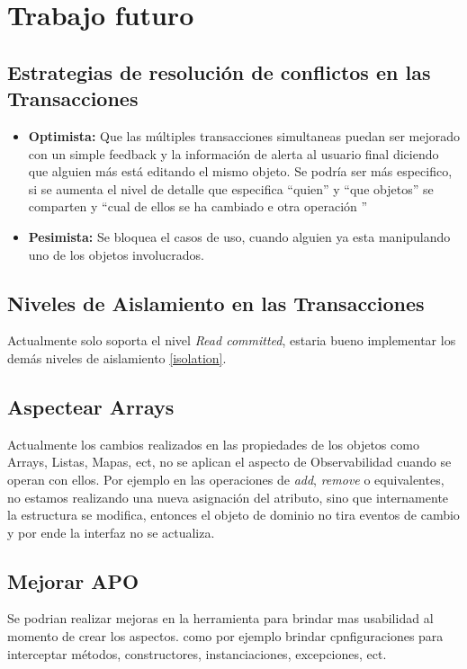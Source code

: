 
\section{Trabajo futuro}
\label{sec:futurework}


	\subsection{Estrategias de resolución de conflictos en las Transacciones}
	
		\begin{itemize}
	
			\item{\bf Optimista:} Que las múltiples  transacciones simultaneas puedan ser
			mejorado con un simple feedback y la información de alerta al
			usuario final diciendo que alguien más está editando el mismo objeto.
			Se podría ser más especifico, si se aumenta el nivel de detalle que especifica
			``quien'' y ``que objetos'' se comparten y ``cual de ellos se ha cambiado e
			otra operación ''
		
			\item{\bf Pesimista:} Se  bloquea el casos de uso, cuando alguien ya esta
			manipulando uno de los objetos involucrados. 
	
		\end{itemize}
		
	\subsection{Niveles de Aislamiento en las Transacciones}
	Actualmente solo soporta el nivel \emph{Read committed}, estaria bueno
	implementar los demás niveles de aislamiento \ref{isolation}.
	
	\subsection{Aspectear Arrays}
		Actualmente los cambios realizados en las propiedades de los objetos como
		Arrays, Listas, Mapas, ect, no se aplican el aspecto de Observabilidad cuando
		se operan con ellos. Por ejemplo en las operaciones de \emph{add}, \emph{remove} o
		equivalentes, no estamos realizando una nueva asignación del atributo, sino
		que internamente la estructura se modifica, entonces el objeto de dominio no
		tira eventos de cambio y por ende la interfaz no se actualiza.
		
	\subsection{Mejorar APO}
		Se podrian realizar mejoras en la herramienta para brindar mas usabilidad al
		momento de crear los aspectos. como por ejemplo brindar cpnfiguraciones para
		interceptar métodos, constructores, instanciaciones, excepciones, ect.
		
